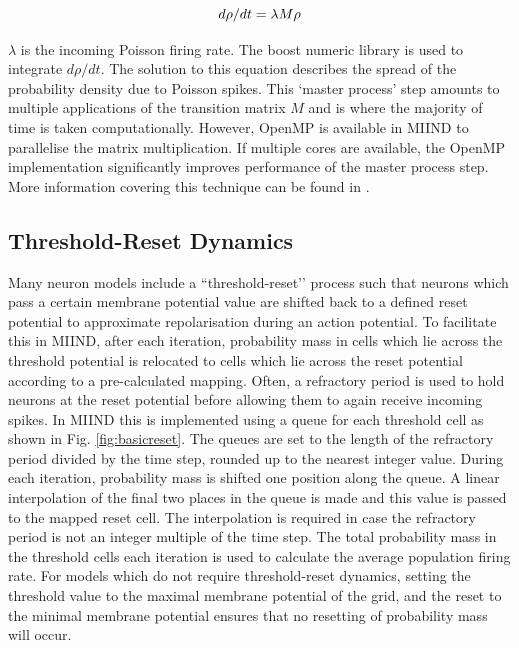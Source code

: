 \documentclass[utf8]{frontiersSCNS} %
\begin{document}
\begin{equation}  
d\rho/dt = \lambda M \rho \\
\label{eq:masterprocess}
\end{equation}

$\lambda$ is the incoming Poisson firing rate. The boost numeric library is used to integrate $d\rho/dt$. The solution to this equation describes the spread of the probability density due to Poisson spikes. This `master process' step amounts to multiple applications of the transition matrix $M$ and is where the majority of time is taken computationally. However, OpenMP is available in MIIND to parallelise the matrix multiplication. If multiple cores are available, the OpenMP implementation significantly improves performance of the master process step. More information covering this technique can be found in \cite{de2019computational,de2013generic}.\\

\subsection{Threshold-Reset Dynamics}
Many neuron models include a ``threshold-reset’’ process such that neurons which pass a certain membrane potential value are shifted back to a defined reset potential to approximate repolarisation during an action potential. To facilitate this in MIIND, after each iteration, probability mass in cells which lie across the threshold potential is relocated to cells which lie across the reset potential according to a pre-calculated mapping. Often, a refractory period is used to hold neurons at the reset potential before allowing them to again receive incoming spikes. In MIIND this is implemented using a queue for each threshold cell as shown in Fig. \ref{fig:basicreset}. The queues are set to the length of the refractory period divided by the time step, rounded up to the nearest integer value. During each iteration, probability mass is shifted one position along the queue. A linear interpolation of the final two places in the queue is made and this value is passed to the mapped reset cell. The interpolation is required in case the refractory period is not an integer multiple of the time step. The total probability mass in the threshold cells each iteration is used to calculate the average population firing rate. For models which do not require threshold-reset dynamics, setting the threshold value to the maximal membrane potential of the grid, and the reset to the minimal membrane potential ensures that no resetting of probability mass will occur.\\ 
\end{document}
